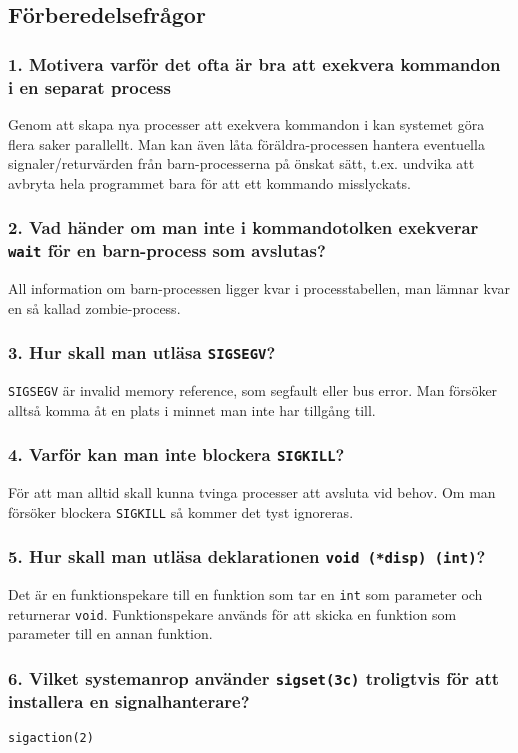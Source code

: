 \documentclass[a4paper]{article}
\begin{document}
\subsection*{Förberedelsefrågor}
\subsubsection*{1. Motivera varför det ofta är bra att exekvera kommandon i en separat process}
Genom att skapa nya processer att exekvera kommandon i kan systemet göra flera saker parallellt. Man kan även låta föräldra-processen hantera eventuella signaler/returvärden från barn-processerna på önskat sätt, t.ex. undvika att avbryta hela programmet bara för att ett kommando misslyckats.

\subsubsection*{2. Vad händer om man inte i kommandotolken exekverar \texttt{wait} för en barn-process som avslutas?}
All information om barn-processen ligger kvar i processtabellen, man lämnar kvar en så kallad zombie-process.

\subsubsection*{3. Hur skall man utläsa \texttt{SIGSEGV}?}
\texttt{SIGSEGV} är invalid memory reference, som segfault eller bus error. Man försöker alltså komma åt en plats i minnet man inte har tillgång till.

\subsubsection*{4. Varför kan man inte blockera \texttt{SIGKILL}?}
För att man alltid skall kunna tvinga processer att avsluta vid behov. Om man försöker blockera \texttt{SIGKILL} så kommer det tyst ignoreras.

\subsubsection*{5. Hur skall man utläsa deklarationen \texttt{void (*disp) (int)}?}
Det är en funktionspekare till en funktion som tar en \texttt{int} som parameter och returnerar \texttt{void}. Funktionspekare används för att skicka en funktion som parameter till en annan funktion.

\subsubsection*{6. Vilket systemanrop använder \texttt{sigset(3c)} troligtvis för att installera en signalhanterare?}
\texttt{sigaction(2)}
\end{document}
